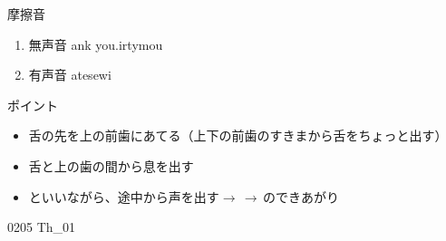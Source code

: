 \documentclass[aspectratio=169, xcolor={dvipsnames,table}]{beamer}
\begin{document}
\begin{frame}[plain,label=slide_Th]{摩擦音}
  \large

  \begin{enumerate}[<+->]
    \item 無声音 \hspace{20pt}ank you.\hspace{1\zw}irty\hspace{1\zw}mou

    \item 有声音 \hspace{20pt}at\hspace{1\zw}ese\hspace{1\zw}wi
  \end{enumerate}

  \vspace*{20pt}

  \normalsize ポイント

  \begin{itemize}[<+->]
    [circle]

    \item 舌の先を上の前歯にあてる（上下の前歯のすきまから舌をちょっと出す）

    \item 舌と上の歯の間から息を出す
    \item {}といいながら、途中から声を出す$\longrightarrow$\,$\longrightarrow$\,のできあがり\\
  \end{itemize}
  \hfill{\tiny 0205}\,{\scriptsize {}}\,{\tiny Th\_01}

\end{frame}
\end{document}

